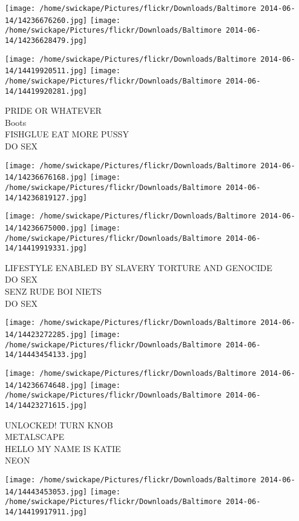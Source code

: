\documentclass[10pt,letterpaper]{article}
\begin{document}
\texttt{[image: /home/swickape/Pictures/flickr/Downloads/Baltimore 2014-06-14/14236676260.jpg]}
\texttt{[image: /home/swickape/Pictures/flickr/Downloads/Baltimore 2014-06-14/14236628479.jpg]}

\texttt{[image: /home/swickape/Pictures/flickr/Downloads/Baltimore 2014-06-14/14419920511.jpg]}
\texttt{[image: /home/swickape/Pictures/flickr/Downloads/Baltimore 2014-06-14/14419920281.jpg]}

PRIDE OR WHATEVER\\
Boots\\
FISHGLUE EAT MORE PUSSY\\
DO SEX\\
\pagebreak

\texttt{[image: /home/swickape/Pictures/flickr/Downloads/Baltimore 2014-06-14/14236676168.jpg]}
\texttt{[image: /home/swickape/Pictures/flickr/Downloads/Baltimore 2014-06-14/14236819127.jpg]}

\texttt{[image: /home/swickape/Pictures/flickr/Downloads/Baltimore 2014-06-14/14236675000.jpg]}
\texttt{[image: /home/swickape/Pictures/flickr/Downloads/Baltimore 2014-06-14/14419919331.jpg]}

LIFESTYLE ENABLED BY SLAVERY TORTURE AND GENOCIDE\\
DO SEX\\
SENZ RUDE BOI NIETS\\
DO SEX\\
\pagebreak

\texttt{[image: /home/swickape/Pictures/flickr/Downloads/Baltimore 2014-06-14/14423272285.jpg]}
\texttt{[image: /home/swickape/Pictures/flickr/Downloads/Baltimore 2014-06-14/14443454133.jpg]}

\texttt{[image: /home/swickape/Pictures/flickr/Downloads/Baltimore 2014-06-14/14236674648.jpg]}
\texttt{[image: /home/swickape/Pictures/flickr/Downloads/Baltimore 2014-06-14/14423271615.jpg]}

UNLOCKED!  TURN KNOB\\
METALSCAPE\\
HELLO MY NAME IS KATIE\\
NEON\\
\pagebreak

\texttt{[image: /home/swickape/Pictures/flickr/Downloads/Baltimore 2014-06-14/14443453053.jpg]}
\texttt{[image: /home/swickape/Pictures/flickr/Downloads/Baltimore 2014-06-14/14419917911.jpg]}
\end{document}
